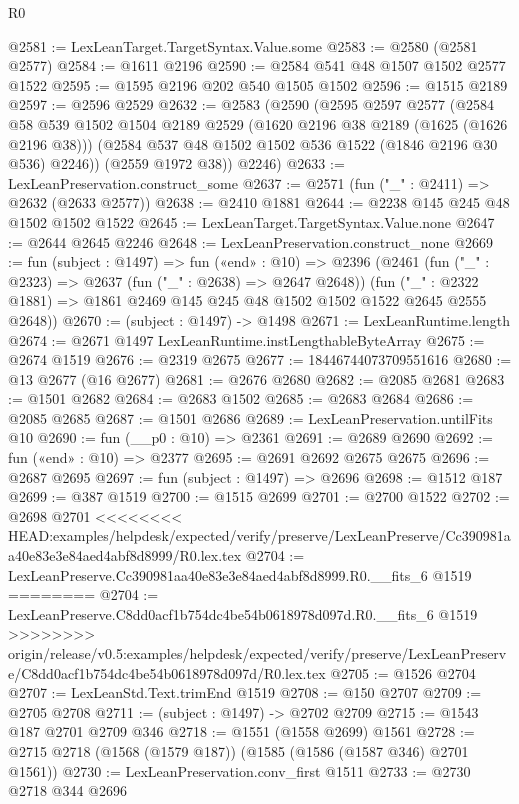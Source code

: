 \begin{lexlean}{R0}
\begin{coremodule}
{{{{{{{{{{{{{{{{{{{{{{{{{{{{{{{{{{{{{{{{{{{{{{{{{{{{{{{{{{{{{{{{{{{{{{{{{@2581 := LexLeanTarget.TargetSyntax.Value.some
@2583 := @2580 (@2581 @2577)
@2584 := @1611 @2196
@2590 := @2584 @541 @48 @1507 @1502 @2577 @1522
@2595 := @1595 @2196 @202 @540 @1505 @1502
@2596 := @1515 @2189
@2597 := @2596 @2529
@2632 := @2583
    (@2590
      (@2595
        @2597
        @2577
        (@2584
          @58
          @539
          @1502
          @1504
          @2189
          @2529
          (@1620 @2196 @38 @2189 (@1625 (@1626 @2196 @38)))
          (@2584 @537 @48 @1502 @1502 @536 @1522 (@1846 @2196 @30 @536) @2246))
        (@2559 @1972 @38))
      @2246)
@2633 := LexLeanPreservation.construct_some
@2637 := @2571 (fun ("_" : @2411) => @2632 (@2633 @2577))
@2638 := @2410 @1881
@2644 := @2238 @145 @245 @48 @1502 @1502 @1522
@2645 := LexLeanTarget.TargetSyntax.Value.none
@2647 := @2644 @2645 @2246
@2648 := LexLeanPreservation.construct_none
@2669 := fun (subject : @1497) =>
  fun («end» : @10) =>
  @2396
    (@2461
      (fun ("_" : @2323) => @2637 (fun ("_" : @2638) => @2647 @2648))
      (fun ("_" : @2322 @1881) => @1861 @2469 @145 @245 @48 @1502 @1502 @1522 @2645 @2555 @2648))
@2670 := (subject : @1497) -> @1498
@2671 := LexLeanRuntime.length
@2674 := @2671 @1497 LexLeanRuntime.instLengthableByteArray
@2675 := @2674 @1519
@2676 := @2319 @2675
@2677 := 18446744073709551616
@2680 := @13 @2677 (@16 @2677)
@2681 := @2676 @2680
@2682 := @2085 @2681
@2683 := @1501 @2682
@2684 := @2683 @1502
@2685 := @2683 @2684
@2686 := @2085 @2685
@2687 := @1501 @2686
@2689 := LexLeanPreservation.untilFits @10
@2690 := fun (__p0 : @10) => @2361
@2691 := @2689 @2690
@2692 := fun («end» : @10) => @2377
@2695 := @2691 @2692 @2675 @2675
@2696 := @2687 @2695
@2697 := fun (subject : @1497) => @2696
@2698 := @1512 @187
@2699 := @387 @1519
@2700 := @1515 @2699
@2701 := @2700 @1522
@2702 := @2698 @2701
<<<<<<<< HEAD:examples/helpdesk/expected/verify/preserve/LexLeanPreserve/Cc390981aa40e83e3e84aed4abf8d8999/R0.lex.tex
@2704 := LexLeanPreserve.Cc390981aa40e83e3e84aed4abf8d8999.R0.__fits_6 @1519
========
@2704 := LexLeanPreserve.C8dd0acf1b754dc4be54b0618978d097d.R0.__fits_6 @1519
>>>>>>>> origin/release/v0.5:examples/helpdesk/expected/verify/preserve/LexLeanPreserve/C8dd0acf1b754dc4be54b0618978d097d/R0.lex.tex
@2705 := @1526 @2704
@2707 := LexLeanStd.Text.trimEnd @1519
@2708 := @150 @2707
@2709 := @2705 @2708
@2711 := (subject : @1497) -> @2702 @2709
@2715 := @1543 @187 @2701 @2709 @346
@2718 := @1551 (@1558 @2699) @1561
@2728 := @2715 @2718 (@1568 (@1579 @187)) (@1585 (@1586 (@1587 @346) @2701 @1561))
@2730 := LexLeanPreservation.conv_first @1511
@2733 := @2730 @2718 @344 @2696
}}}}}}}}}}}}}}}}}}}}}}}}}}}}}}}}}}}}}}}}}}}}}}}}}}}}}}}}}}}}}}}}}}}}}}}}}
\end{coremodule}
\end{lexlean}
